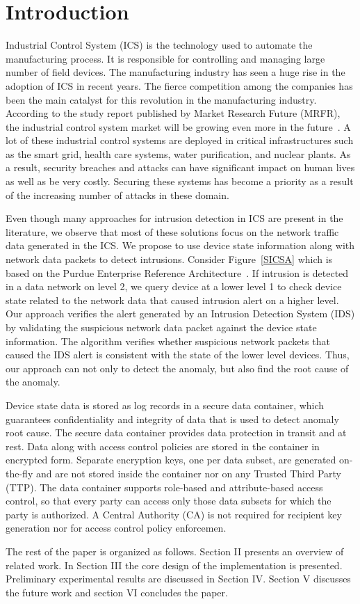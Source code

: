 \documentclass[conference]{IEEEtran}
\begin{document}
\section{Introduction}
Industrial Control System (ICS) is the technology used to automate the manufacturing process. It is responsible for controlling and managing large number of field devices. The manufacturing industry has seen a huge rise in the adoption of ICS in recent years. The fierce competition among the companies has been the main catalyst for this revolution in the manufacturing industry. According to the study report published by  Market Research Future (MRFR), the industrial control system market will be growing even more in the future~\cite{c1}. A lot of these industrial control systems are deployed in critical infrastructures such as the smart grid, health care systems, water purification, and nuclear plants. As a result, security breaches and attacks can have significant impact on human lives as well as be very costly. Securing these systems has become a priority as a result of the increasing number of attacks in these domain. 
\par Even though many approaches for intrusion detection in ICS are present in the literature, we observe that most of these solutions focus on the network traffic data generated in the ICS. We propose to use device state information along with network data packets to detect intrusions. Consider Figure~\ref{SICSA} which is based on the Purdue Enterprise Reference Architecture~\cite{}. If intrusion is detected in a data network on level 2, we query device at a lower level 1 to check  device state related to the network data that caused intrusion alert on a higher level. Our approach verifies the alert generated by an Intrusion Detection System (IDS) by validating the suspicious network data packet against the device state information. The algorithm verifies whether suspicious network packets that caused the IDS alert is consistent with the state of the lower level devices. Thus, our approach can not only to detect the anomaly, but also find the root cause of the anomaly. 

Device state data is stored as log records in a secure data container, which guarantees confidentiality and integrity of data that is used to detect anomaly root cause. The secure data container provides data protection in transit and at rest. Data along with access control policies are stored in the container in encrypted form. Separate encryption keys, one per data subset, are generated on-the-fly and are not stored inside the container nor on any Trusted Third Party (TTP). The data container supports role-based and attribute-based access control, so that every party can access only those data subsets for which the party is authorized. A Central Authority (CA) is not required for recipient key generation nor for access control policy enforcemen.      
\par The rest of the paper is organized as follows. Section II presents an overview of related work. In Section III the core design of the implementation is presented. Preliminary experimental results are discussed in Section IV. Section V discusses the future work and section VI concludes the paper.  
\end{document}
